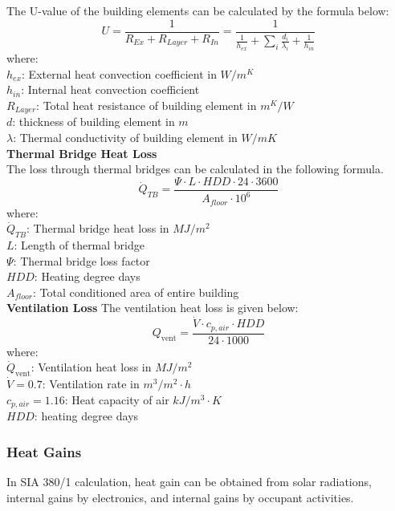 \documentclass[11pt, a4paper]{article}
\theoremstyle{definition}
\begin{document}
				The U-value of the building elements can be calculated by the formula below: \\
				\[U = \frac{1}{R_{Ex}+R_{Layer}+R_{In}} = \frac{1}{\frac{1}{h_{ex}}+\sum_{i}\frac{d_i}{\lambda_i} + \frac{1}{h_{in}}}\]
				where:\\
				$h_{ex}$: External heat convection coefficient in $W/m^K$\\
				$h_{in}$: Internal heat convection coefficient\\
				$R_{Layer}$: Total heat resistance of building element in $m^K/W$\\
				$d$: thickness of building element in $m$\\
				$\lambda$: Thermal conductivity of building element in $W/mK$\\


			\textbf{Thermal Bridge Heat Loss}\\
				The loss through thermal bridges can be calculated in the following formula.\\
				\[\dot{Q}_{TB} = \frac{\Psi \cdot L \cdot HDD \cdot 24 \cdot 3600}{A_{floor} \cdot 10^6}\]
				where:\\
				$\dot{Q}_{TB}$: Thermal bridge heat loss in $MJ/m^2$\\
				$L$: Length of thermal bridge\\
				$\Psi$: Thermal bridge loss factor\\ 
				$HDD$: Heating degree days\\
				$A_{floor}$: Total conditioned area of entire building\\


			\textbf{Ventilation Loss}
				The ventilation heat loss is given below:\\
				\[Q_{\text{vent}} = \frac{\dot{V} \cdot c_{p,air} \cdot HDD}{24 \cdot 1000}\]
				where:\\
				$\dot{Q}_{\text{vent}}$: Ventilation heat loss in $MJ/m^2$\\
				$\dot{V} = 0.7$: Ventilation rate in $m^3/m^2\cdot h$\\
				$c_{p,air} = 1.16$: Heat capacity of air $kJ/m^3 \cdot K$\\
				$HDD$: heating degree days\\


		\subsubsection{Heat Gains}
			In SIA 380/1 calculation, heat gain can be obtained from solar radiations, internal gains by electronics, and internal gains by occupant activities.\\
			
\end{document}
